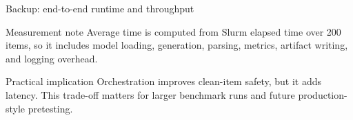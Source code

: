 \documentclass[aspectratio=169,10pt]{beamer}
\begin{document}
\begin{frame}{Backup: end-to-end runtime and throughput}
\scriptsize
{}

\vspace{3mm}
\begin{block}{Measurement note}
Average time is computed from Slurm elapsed time over 200 items, so it includes model loading, generation, parsing, metrics, artifact writing, and logging overhead.
\end{block}

\begin{alertblock}{Practical implication}
Orchestration improves clean-item safety, but it adds latency. This trade-off matters for larger benchmark runs and future production-style pretesting.
\end{alertblock}
\end{frame}

\end{document}
